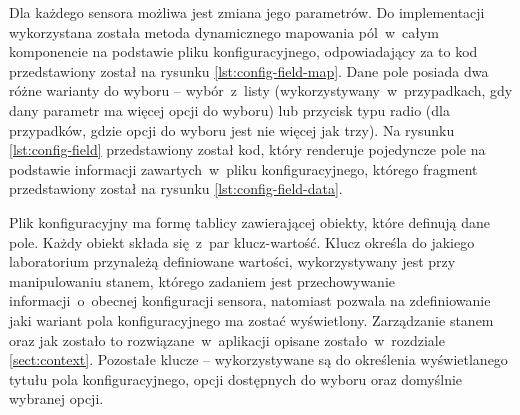 Dla każdego sensora możliwa jest zmiana jego parametrów. Do implementacji wykorzystana została
metoda dynamicznego mapowania pól~w~całym komponencie na podstawie pliku konfiguracyjnego,
odpowiadający za to kod przedstawiony został na rysunku \ref{lst:config-field-map}. Dane pole
posiada dwa różne warianty do wyboru -- wybór~z~listy (wykorzystywany~w~przypadkach, gdy dany
parametr ma więcej opcji do wyboru) lub przycisk typu radio (dla przypadków, gdzie opcji do wyboru
jest nie więcej jak trzy). Na rysunku \ref{lst:config-field} przedstawiony został kod, który
renderuje pojedyncze pole na podstawie informacji zawartych~w~pliku konfiguracyjnego, którego
fragment przedstawiony został na rysunku \ref{lst:config-field-data}.




Plik konfiguracyjny ma formę tablicy zawierającej obiekty, które definują dane pole. Każdy obiekt
składa się~z~par klucz-wartość. Klucz  określa do jakiego laboratorium przynależą
definiowane wartości,  wykorzystywany jest przy manipulowaniu stanem, którego zadaniem
jest przechowywanie informacji~o~obecnej konfiguracji sensora, natomiast  pozwala na
zdefiniowanie jaki wariant pola konfiguracyjnego ma zostać wyświetlony. Zarządzanie stanem oraz jak
zostało to rozwiązane~w~aplikacji opisane zostało~w~rozdziale \ref{sect:context}. Pozostałe klucze
--  wykorzystywane są do określenia
wyświetlanego tytułu pola konfiguracyjnego, opcji dostępnych do wyboru oraz domyślnie
wybranej opcji.